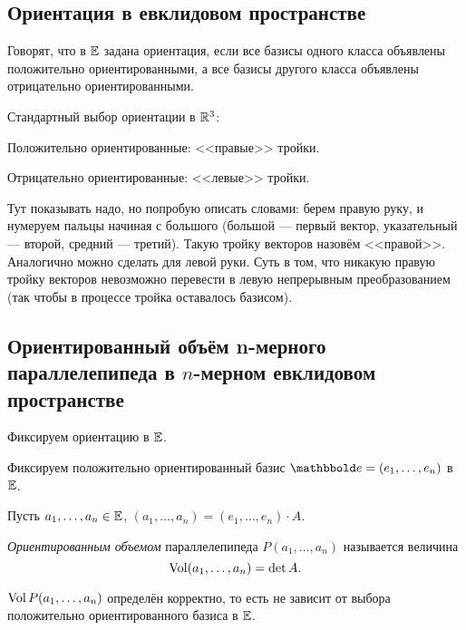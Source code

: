 \subsection{Ориентация в евклидовом пространстве}

\begin{definition}
    Говорят, что в $\mathbb{E}$ задана ориентация, если все базисы одного класса объявлены положительно ориентированными, а все базисы другого класса объявлены отрицательно ориентированными.
\end{definition}

\begin{example}
    Стандартный выбор ориентации в $\mathbb{R}^3$:

    Положительно ориентированные: <<правые>> тройки.

    Отрицательно ориентированные: <<левые>> тройки.

    \bigskip
    Тут показывать надо, но попробую описать словами: берем правую руку, и нумеруем пальцы начиная с большого (большой --- первый вектор, указательный --- второй, средний --- третий). Такую тройку векторов назовём <<правой>>. Аналогично можно сделать для левой руки. Суть в том, что никакую правую тройку векторов невозможно перевести в левую непрерывным преобразованием (так чтобы в процессе тройка оставалось базисом).
\end{example}


\subsection{Ориентированный объём n-мерного параллелепипеда в $n$-мерном евклидовом пространстве}

Фиксируем ориентацию в $\mathbb{E}$.

Фиксируем положительно ориентированный базис $\E = (e_1, \dots, e_n)$ в $\mathbb{E}$.

Пусть $a_1, \dots, a_n \in \mathbb{E}$, $(a_1, \dots, a_n) = (e_1, \dots, e_n) \cdot A$.

\begin{definition}
    \textit{Ориентированным объемом} параллелепипеда $P(a_1, \dots, a_n)$ называется величина
    \begin{equation*}
        \operatorname{\mathop{\mathrm{Vol}}} (a_1, \dots, a_n) = \det A
    .\end{equation*}
\end{definition}

\begin{proposal}
    $\operatorname{\mathop{\mathrm{Vol}}} P(a_1, \dots, a_n)$ определён корректно, то есть не зависит от выбора положительно ориентированного базиса в $\mathbb{E}$.
\end{proposal}

